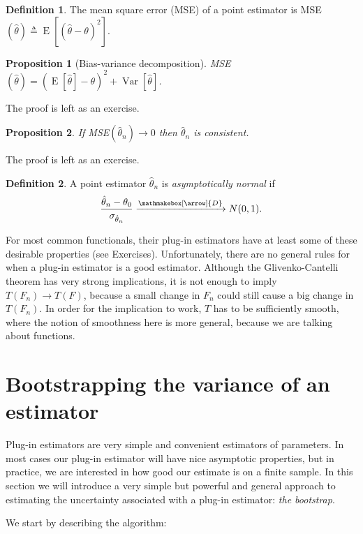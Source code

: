 \documentclass{book}
\theoremstyle{plain}%
\newtheorem{proposition}{Proposition}[section]
\theoremstyle{definition}
\newtheorem{definition}{Definition}[section]
\DeclareMathOperator{\Var}{Var}
\DeclareMathOperator{\E}{E}
\newlength{\arrow}
\newcommand*{\myrightarrow}[1]{\xrightarrow{\mathmakebox[\arrow]{#1}}}
\begin{document}
\begin{definition} The mean square error (MSE) of a point estimator is
MSE$(\hat{\theta}) \triangleq \E[(\hat{\theta} - \theta)^2]$.
\end{definition}

\begin{proposition}[Bias-variance decomposition] MSE$(\hat{\theta}) = (\E[\hat{\theta}] - \theta)^2 + \Var[\hat{\theta}]$.\label{prop:biasvar}
\end{proposition}

The proof is left as an exercise.

\begin{proposition} If MSE$(\hat{\theta}_n) \rightarrow 0$ then $\hat{\theta}_n$ is consistent.\label{prop:consistent}
\end{proposition}

The proof is left as an exercise.

\begin{definition} A point estimator $\hat{\theta}_n$  is \textit{asymptotically normal} if $$\frac{\hat{\theta}_n - \theta_0}{\sigma_{\hat{\theta}_n}} \myrightarrow{D} N(0,1).$$
\end{definition}

For most common functionals, their plug-in estimators have at least some of these desirable properties (see Exercises). Unfortunately, there are no general rules for when a plug-in estimator is a good estimator. Although the Glivenko-Cantelli theorem has very strong implications, it is not enough to imply $T(F_n) \rightarrow T(F)$, because a small change in $F_n$ could still cause a big change in $T(F_n)$. In order for the implication to work, $T$ has to be sufficiently smooth, where the notion of smoothness here is more general, because we are talking about functions.

\section{Bootstrapping the variance of an estimator}

Plug-in estimators are very simple and convenient estimators of parameters. In most cases our plug-in estimator will have nice asymptotic properties, but in practice, we are interested in how good our estimate is on a finite sample. In this section we will introduce a very simple but powerful and general approach to estimating the uncertainty associated with a plug-in estimator: \textit{the bootstrap}.

We start by describing the algorithm:
\end{document}
